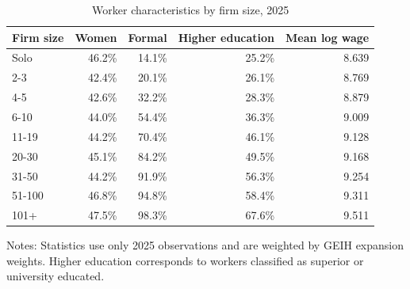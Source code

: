 \begin{table}[htbp]
  \centering
  \caption{Worker characteristics by firm size, 2025}
  \label{tab:descriptive-worker-characteristics-2025}
  \small
  \begin{tabular}{lrrrr}
    \toprule
    Firm size & Women & Formal & Higher education & Mean log wage \\
    \midrule
    Solo & 46.2\% & 14.1\% & 25.2\% & 8.639 \\
    2-3 & 42.4\% & 20.1\% & 26.1\% & 8.769 \\
    4-5 & 42.6\% & 32.2\% & 28.3\% & 8.879 \\
    6-10 & 44.0\% & 54.4\% & 36.3\% & 9.009 \\
    11-19 & 44.2\% & 70.4\% & 46.1\% & 9.128 \\
    20-30 & 45.1\% & 84.2\% & 49.5\% & 9.168 \\
    31-50 & 44.2\% & 91.9\% & 56.3\% & 9.254 \\
    51-100 & 46.8\% & 94.8\% & 58.4\% & 9.311 \\
    101+ & 47.5\% & 98.3\% & 67.6\% & 9.511 \\
    \bottomrule
  \end{tabular}
  \vspace{0.3em}
  \begin{minipage}{0.95\textwidth}
  \footnotesize
  Notes: Statistics use only 2025 observations and are weighted by GEIH expansion weights. Higher education corresponds to workers classified as superior or university educated.
  \end{minipage}
\end{table}
